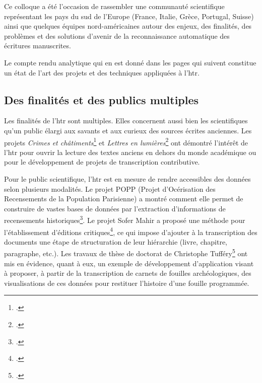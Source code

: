 \documentclass[a4paper,12pt,twoside]{book}
\begin{document}
			Ce colloque a été l'occasion de rassembler une communauté scientifique
			représentant les pays du sud de l'Europe (France, Italie, Grèce,
			Portugal, Suisse) ainsi que quelques équipes nord-américaines autour
			des enjeux, des finalités, des problèmes et des solutions d'avenir de la
			reconnaissance automatique des écritures manuscrites.
			
			Le compte rendu analytique qui en est donné dans les pages qui suivent constitue un état de l'art des projets et des techniques appliquées à l'\gls{htr}.
			
			\subsection{Des finalités et des publics multiples}
		
				Les finalités de l'\gls{htr} sont multiples. Elles concernent aussi bien les
				scientifiques qu'un public élargi aux savants et aux curieux des sources
				écrites anciennes. Les projets \textit{Crimes et châtiments}\footcite{paupeCursiveXVIIeSiecle2022} et
				\textit{Lettres en lumières}\footcite{fizaineLettresLumieres2022a} ont démontré l'intérêt de l'\gls{htr} pour
				ouvrir la lecture des textes anciens en dehors du monde académique ou
				pour le développement de projets de transcription contributive.
				
				Pour le public scientifique, l'\gls{htr} est en mesure de rendre accessibles
				des données selon plusieurs modalités. Le projet POPP (Projet
				d'Océrisation des Recensements de la Population Parisienne) a montré
				comment elle permet de construire de vastes bases de données par
				l'extraction d'informations de recensements historiques\footcite{constumReconnaissanceExtractionInformations2022}. Le projet Sofer
				Mahir a proposé une méthode pour l'établissement d'éditions critiques\footcite{stoklbenezraHTRCriticalEdition2022}, ce qui impose d'ajouter à la
				transcription des documents une étape de structuration de leur
				hiérarchie (livre, chapitre, paragraphe, etc.). Les travaux de thèse de doctorat de
				Christophe Tufféry\footcite{tufferyRetourExperiencesUtilisation2022} ont
				mis en évidence, quant à eux, un exemple de développement d'application
				visant à proposer, à partir de la transcription de carnets de fouilles
				archéologiques, des visualisations de ces données pour restituer
				l'histoire d'une fouille programmée.
				
\end{document}
